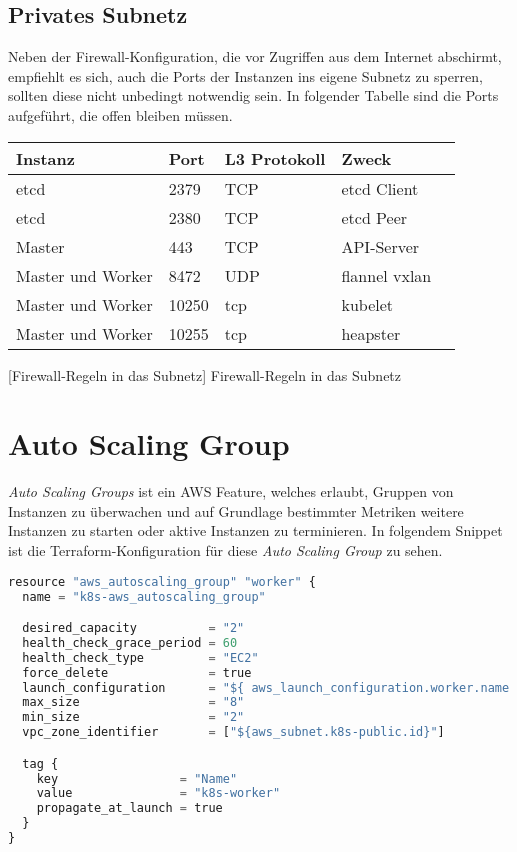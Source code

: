 \subsection{Privates Subnetz}

Neben der Firewall-Konfiguration, die vor Zugriffen aus dem Internet abschirmt,
empfiehlt es sich, auch die Ports der Instanzen ins eigene Subnetz zu sperren,
sollten diese nicht unbedingt notwendig sein. In folgender Tabelle sind
die Ports aufgeführt, die offen bleiben müssen.

\begin{flushleft}
\centering
\begin{tabular}{ | l | l | l | l | l | }
  \hline
  Instanz & Port & L3 Protokoll & Zweck \\ \hline \hline
  etcd & 2379 & TCP & etcd Client  \\ \hline
  etcd & 2380 & TCP & etcd Peer \\ \hline
  Master & 443 & TCP & API-Server \\ \hline
  Master und Worker & 8472 & UDP & flannel vxlan  \\ \hline
  Master und Worker & 10250 & tcp & kubelet \\ \hline
  Master und Worker & 10255 & tcp & heapster \\ \hline
\end{tabular}
    [Firewall-Regeln in das Subnetz]
    {Firewall-Regeln in das Subnetz}
\end{flushleft}

\section{Auto Scaling Group}

\emph{Auto Scaling Groups} ist ein AWS Feature, welches erlaubt, Gruppen von
Instanzen zu überwachen und auf Grundlage bestimmter Metriken weitere
Instanzen zu starten oder aktive Instanzen zu terminieren.
In folgendem Snippet ist die Terraform-Konfiguration für diese
\emph{Auto Scaling Group} zu sehen.

\begin{lstlisting}[language=Python,numbers=none]
resource "aws_autoscaling_group" "worker" {
  name = "k8s-aws_autoscaling_group"

  desired_capacity          = "2"
  health_check_grace_period = 60
  health_check_type         = "EC2"
  force_delete              = true
  launch_configuration      = "${ aws_launch_configuration.worker.name }"
  max_size                  = "8"
  min_size                  = "2"
  vpc_zone_identifier       = ["${aws_subnet.k8s-public.id}"]

  tag {
    key                 = "Name"
    value               = "k8s-worker"
    propagate_at_launch = true
  }
}\end{lstlisting}

